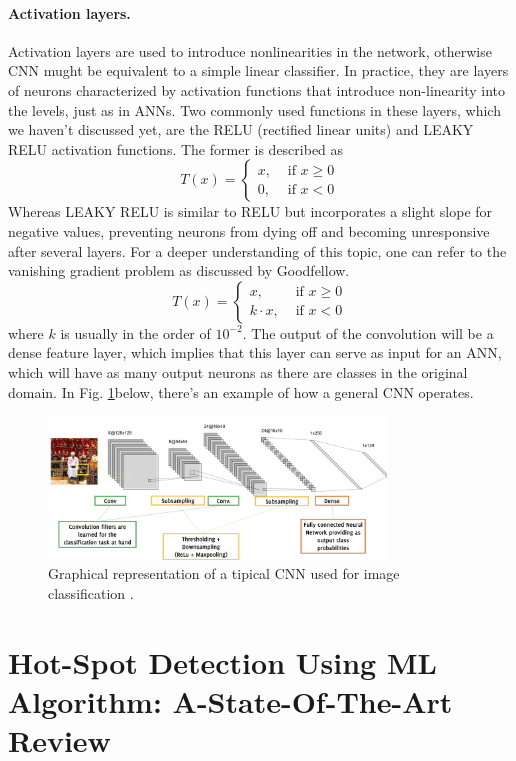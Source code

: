 \paragraph{Activation layers.} Activation layers are used to introduce nonlinearities in the network, otherwise CNN mught be equivalent to a simple linear classifier. In practice, they are layers of neurons characterized by activation functions that introduce non-linearity into the levels, just as in ANNs. Two commonly used functions in these layers, which we haven't discussed yet, are the RELU (rectified linear units) and LEAKY RELU activation functions. The former is described as
\begin{equation}
    \label{eq:RELU}
    T(x)=\left\{\begin{array}{rr}
    x, & \text { if } x \geq 0 \\
    0, & \text { if } x<0
\end{array}\right.
\end{equation}
Whereas LEAKY RELU is similar to RELU but incorporates a slight slope for negative values, preventing neurons from dying off and becoming unresponsive after several layers. For a deeper understanding of this topic, one can refer to the vanishing gradient problem as discussed by Goodfellow.
\begin{equation}
    \label{eq:LEAKYRELU}
    T(x)=\left\{\begin{array}{rr}
    x, & \text { if } x \geq 0 \\
    k\cdot x, & \text { if } x<0
\end{array}\right.
\end{equation}
where $k$ is usually in the order of $10^{-2}$.
The output of the convolution will be a dense feature layer, which implies that this layer can serve as input for an ANN, which will have as many output neurons as there are classes in the original domain. In Fig. \ref{fig:typicalcnn}below, there's an example of how a general CNN operates.
\begin{figure}
    \centering
    \includegraphics[width=0.8\textwidth]{Images/CNNtypical.png}
    \caption[CNN general structure.]{Graphical representation of a tipical CNN used for image classification \cite{giacomo_boracchi_convolutional_2021}.}
    \label{fig:typicalcnn}
\end{figure}


\section{Hot-Spot Detection Using ML Algorithm: A-State-Of-The-Art Review}
\label{sec:hotspotstateart}
